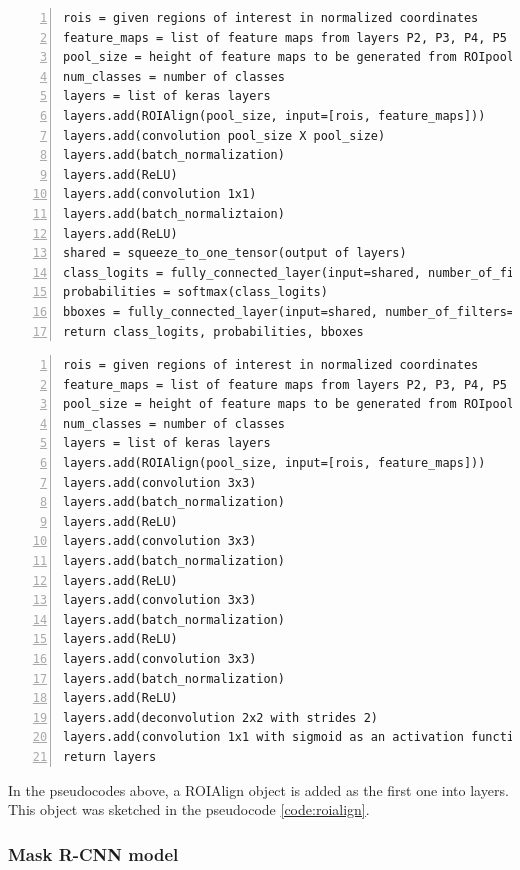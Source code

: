 {\scriptsize
\begin{lstlisting}[style=python, caption={fpn\_classifier\_graph}, captionpos=b, label=code:classifier, deletekeywords={from, input, map, in},
backgroundcolor = \color{light-gray}, numbers=left, breaklines=true]
rois = given regions of interest in normalized coordinates
feature_maps = list of feature maps from layers P2, P3, P4, P5
pool_size = height of feature maps to be generated from ROIpooling
num_classes = number of classes
layers = list of keras layers
layers.add(ROIAlign(pool_size, input=[rois, feature_maps]))
layers.add(convolution pool_size X pool_size)
layers.add(batch_normalization)
layers.add(ReLU)
layers.add(convolution 1x1)
layers.add(batch_normaliztaion)
layers.add(ReLU)
shared = squeeze_to_one_tensor(output of layers)
class_logits = fully_connected_layer(input=shared, number_of_filters=num_classes)
probabilities = softmax(class_logits)
bboxes = fully_connected_layer(input=shared, number_of_filters=4 * num_classes)
return class_logits, probabilities, bboxes
\end{lstlisting}}

{\scriptsize
\begin{lstlisting}[style=python, caption={build\_fpn\_maskk\_graph}, captionpos=b, label=code:mask, deletekeywords={from, input, map, in},
backgroundcolor = \color{light-gray}, numbers=left, breaklines=true]
rois = given regions of interest in normalized coordinates
feature_maps = list of feature maps from layers P2, P3, P4, P5
pool_size = height of feature maps to be generated from ROIpooling
num_classes = number of classes
layers = list of keras layers
layers.add(ROIAlign(pool_size, input=[rois, feature_maps]))
layers.add(convolution 3x3)
layers.add(batch_normalization)
layers.add(ReLU)
layers.add(convolution 3x3)
layers.add(batch_normalization)
layers.add(ReLU)
layers.add(convolution 3x3)
layers.add(batch_normalization)
layers.add(ReLU)
layers.add(convolution 3x3)
layers.add(batch_normalization)
layers.add(ReLU)
layers.add(deconvolution 2x2 with strides 2)
layers.add(convolution 1x1 with sigmoid as an activation function)
return layers
\end{lstlisting}}

In the pseudocodes above, a ROIAlign object is added as the first one into layers. This object was sketched in the pseudocode \ref{code:roialign}.

\subsubsection{Mask R-CNN model}
\label{model-mrcnn}

